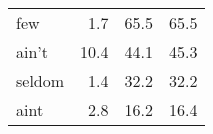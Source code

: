 \begin{table}[ht]
\begin{tabular}{lrrr}
few & {\cellcolor[HTML]{FFFFD9}} \color[HTML]{000000} 1.7 & {\cellcolor[HTML]{FBFDD0}} \color[HTML]{000000} 65.5 & {\cellcolor[HTML]{FBFDD0}} \color[HTML]{000000} 65.5 \\
ain't & {\cellcolor[HTML]{F9FDCB}} \color[HTML]{000000} 10.4 & {\cellcolor[HTML]{FDFED4}} \color[HTML]{000000} 44.1 & {\cellcolor[HTML]{FDFED4}} \color[HTML]{000000} 45.3 \\
seldom & {\cellcolor[HTML]{FFFFD9}} \color[HTML]{000000} 1.4 & {\cellcolor[HTML]{FEFFD6}} \color[HTML]{000000} 32.2 & {\cellcolor[HTML]{FEFFD6}} \color[HTML]{000000} 32.2 \\
aint & {\cellcolor[HTML]{FEFFD8}} \color[HTML]{000000} 2.8 & {\cellcolor[HTML]{FFFFD9}} \color[HTML]{000000} 16.2 & {\cellcolor[HTML]{FFFFD9}} \color[HTML]{000000} 16.4 \\
\bottomrule
\end{tabular}
\end{table}

